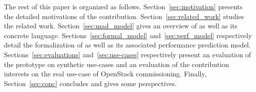 The rest of this paper is organized as follows. Section~\ref{sec:motivation} presents the detailed motivations of the contribution. Section~\ref{sec:related_work} studies the related work. Section~\ref{sec:mad_model} gives an overview of \mad as well as its concrete language. Sections~\ref{sec:formal_model} and~\ref{sec:perf_model} respectively detail the formalization of \mad as well as its associated performance prediction model. Sections~\ref{sec:evaluations} and~\ref{sec:use-cases} respectively present an evaluation of the \mad prototype on synthetic use-cases and an evaluation of the contribution interests on the real use-case of OpenStack commissioning.  Finally, Section~\ref{sec:conc} concludes and gives some perspectives.




